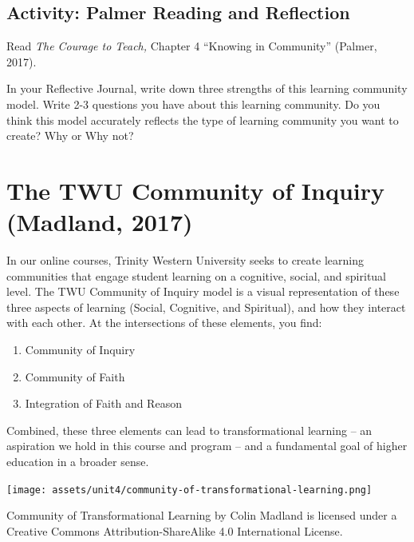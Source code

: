 \documentclass[
]{book}
\providecommand{\tightlist}{%
  \setlength{\itemsep}{0pt}\setlength{\parskip}{0pt}}
\begin{document}
\hypertarget{activity-palmer-reading-and-reflection-1}{%
\subsection{Activity: Palmer Reading and Reflection}\label{activity-palmer-reading-and-reflection-1}}

\begin{reflect}
Read \emph{The Courage to Teach,} Chapter 4 ``Knowing in Community''
(Palmer, 2017).

In your Reflective Journal, write down three strengths of this learning
community model. Write 2-3 questions you have about this learning
community. Do you think this model accurately reflects the type of
learning community you want to create? Why or Why not?
\end{reflect}

\hypertarget{the-twu-community-of-inquiry-madland-2017}{%
\section{The TWU Community of Inquiry (Madland, 2017)}\label{the-twu-community-of-inquiry-madland-2017}}

In our online courses, Trinity Western University seeks to create learning communities that engage student learning on a cognitive, social, and spiritual level. The TWU Community of Inquiry model is a visual representation of these three aspects of learning (Social, Cognitive, and Spiritual), and how they interact with each other. At the intersections of these elements, you find:

\begin{enumerate}
\def\labelenumi{\arabic{enumi}.}
\tightlist
\item
  Community of Inquiry
\item
  Community of Faith
\item
  Integration of Faith and Reason
\end{enumerate}

Combined, these three elements can lead to transformational learning -- an aspiration we hold in this course and program -- and a fundamental goal of higher education in a broader sense.

\texttt{[image: assets/unit4/community-of-transformational-learning.png]}

{Community of Transformational Learning} by Colin Madland is licensed under a Creative Commons Attribution-ShareAlike 4.0 International License.
\end{document}
